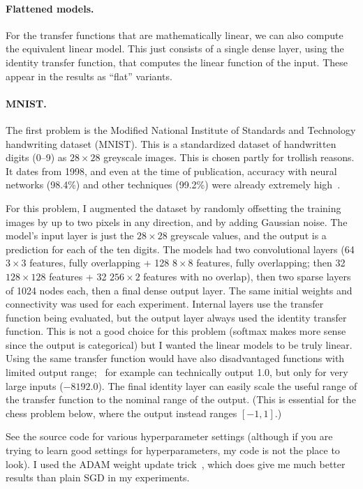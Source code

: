 \documentclass[twocolumn]{article}
\newcommand\xbyx[2]{\ensuremath{#1 {\times} #2}}
\begin{document}
\paragraph{Flattened models.}
For the transfer functions that are mathematically linear, we can also
compute the equivalent linear model. This just consists of a single
dense layer, using the identity transfer function, that computes the
linear function of the input. These appear in the results as ``flat''
variants.

\paragraph{MNIST.}
The first problem is the Modified National Institute of Standards and
Technology handwriting dataset (MNIST). This is a standardized dataset
of handwritten digits (0–9) as \xbyx{28}{28} greyscale images. This is chosen
partly for trollish reasons. It dates from 1998, and even at the time
of publication, accuracy with neural networks (98.4\%) and other
techniques (99.2\%) were already extremely high~\cite{lecun1998gradient}.

For this problem, I augmented the dataset by randomly offsetting the
training images by up to two pixels in any direction, and by adding
Gaussian noise. The model's input layer is just the $28 \times 28$
greyscale values, and the output is a prediction for each of the ten
digits. The models had two convolutional layers (64 \xbyx{3}{3} features,
fully overlapping + 128 \xbyx{8}{8} features, fully overlapping; then
32 \xbyx{128}{128} features + 32 \xbyx{256}{2} features with no
overlap), then two sparse layers of 1024 nodes each, then a final
dense output layer. The same initial weights and connectivity was used
for each experiment. Internal layers use the transfer function being
evaluated, but the output layer always used the identity transfer
function. This is not a good choice for this problem (softmax makes
more sense since the output is categorical) but I wanted the linear
models to be truly linear. Using the same transfer function would have
also disadvantaged functions with limited output range; \downshifttwo\
for example can technically output 1.0, but only for very large inputs
($-8192.0$). The final identity layer can easily scale the useful range
of the transfer function to the nominal range of the output. (This is
essential for the chess problem below, where the output instead ranges
$[-1, 1]$.)

See the source code for various hyperparameter settings (although if
you are trying to learn good settings for hyperparameters, my code is
not the place to look). I used the ADAM weight update
trick~\cite{kingma2014adam}, which does give me much better results
than plain SGD in my experiments.
\end{document}
